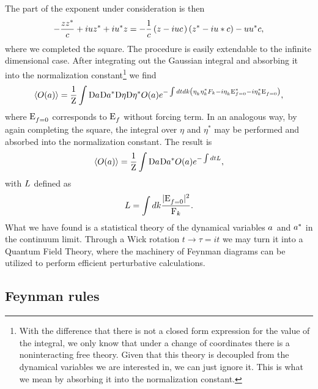 The part of the exponent under consideration is then
\begin{equation}
    -\frac{zz^*}{c} + iuz^* + iu^*z = -\frac{1}{c} \left(z - iuc \phantom{z^*}\hspace{-3mm}\right)\left(z^* - iu*c \right) - uu^*c,
\end{equation}
where we completed the square. The procedure is easily extendable to the infinite dimensional case. After integrating out the Gaussian integral and absorbing it into the 
normalization constant\footnote{With the difference that there is not a closed form expression 
for the value of the integral, we only know that under a change of coordinates there is a noninteracting free theory. Given that this theory is decoupled 
from the dynamical variables we are interested in,
we can just ignore it. This is what we mean by absorbing it into the normalization constant.}  we find
\begin{equation}
    \langle O(a) \rangle = \frac{1}{\mathrm{Z}}\int\mathrm{D} a^{} \mathrm{D}a^{*}\mathrm{D} \eta\mathrm{D} \eta^*  O(a)
    e^{-\int dt dk \left( \eta_k^{}\eta_k^* F_k - i\eta_k^{}\mathrm{E}_{f=0}^* -i\eta_k^* \mathrm{E}_{f=0}^{} \right)},
    \label{expect3}
\end{equation}
where $\mathrm{E}_{f=0}^{}$ corresponds to $\mathrm{E}_f^{}$ without forcing term. In an analogous way, by again completing the square, the integral over $\eta$ and $\eta^*$ may be performed and 
absorbed into the normalization constant.
The result is 
\begin{equation}
    \langle O(a) \rangle = \frac{1}{\mathrm{Z}}\int\mathrm{D} a^{} \mathrm{D}a^{*} O(a)
    e^{-\int dt L},
    \label{expect}
\end{equation} 
with $L$ defined as 
\begin{equation}
    L = \int dk \frac{|\mathrm{E}_{f=0}^{}|^2}{\mathrm{F}_k}.
    \label{Lag}
\end{equation}
What we have found is a statistical theory of the dynamical variables $a^{}$ and $a^{*}$ in the continuum limit. Through a Wick rotation $t \rightarrow \tau = it$ we 
may turn it into a Quantum Field Theory, where the machinery of Feynman diagrams can be utilized to perform efficient perturbative calculations.\\

\subsection{Feynman rules} 

